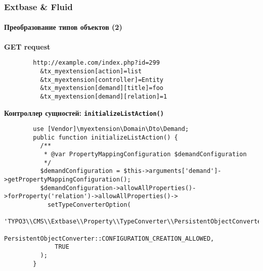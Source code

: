 
\begin{frame}[fragile]
	\frametitle{Extbase \& Fluid}
	\framesubtitle{Преобразование типов объектов (2)}

	\lstset{
		basicstyle=\tiny\ttfamily
	}

	\smaller\textbf{GET request}\normalsize
	\begin{lstlisting}
		http://example.com/index.php?id=299
		  &tx_myextension[action]=list
		  &tx_myextension[controller]=Entity
		  &tx_myextension[demand][title]=foo
		  &tx_myextension[demand][relation]=1
	\end{lstlisting}

	\smaller\textbf{Контроллер сущностей: \texttt{initializeListAction()}}\normalsize
	\begin{lstlisting}
		use [Vendor]\myextension\Domain\Dto\Demand;
		public function initializeListAction() {
		  /**
		   * @var PropertyMappingConfiguration $demandConfiguration
		   */
		  $demandConfiguration = $this->arguments['demand']->getPropertyMappingConfiguration();
		  $demandConfiguration->allowAllProperties()->forProperty('relation')->allowAllProperties()->
		    setTypeConverterOption(
		      'TYPO3\\CMS\\Extbase\\Property\\TypeConverter\\PersistentObjectConverter',
		      PersistentObjectConverter::CONFIGURATION_CREATION_ALLOWED,
		      TRUE
		  );
		}
	\end{lstlisting}

\end{frame}


